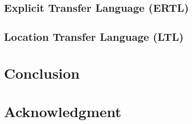 \documentclass[conference]{IEEEtran}
\begin{document}

\subsection{Explicit Transfer Language (ERTL)}
\subsection{Location Transfer Language (LTL)}
\section{Conclusion}

\section*{Acknowledgment}

\newpage
{}


\end{document}
